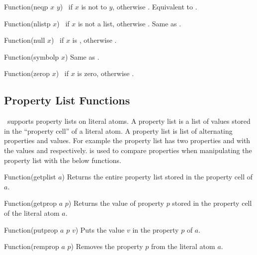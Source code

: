 \begin{defun}{Function}{(neqp $x$ $y$)}
  \T\ if $x$ is not  to $y$, otherwise \NIL. Equivalent to
  .
\end{defun}

\begin{defun}{Function}{(nlistp $x$)}
  \T\ if $x$ is not a list, otherwise \NIL. Same as .
\end{defun}

\begin{defun}{Function}{(null $x$)}
  \T\ if $x$ is \NIL, otherwise \NIL.
\end{defun}

\begin{defun}{Function}{(symbolp $x$)}
  Same as .
\end{defun}

\begin{defun}{Function}{(zerop $x$)}
  \T\ if $x$ is zero, otherwise \NIL.
\end{defun}

\subsection{Property List Functions}
\lips\ supports property lists on literal atoms. A property list is a
list of values stored in the ``property cell'' of a literal atom. A
property list is list of alternating properties and values. For
example the property list  has two properties 
and  with the values  and 
respectively.  is used to compare properties when
manipulating the property list with the below functions.

\begin{defun}{Function}{(getplist $a$)}
  Returns the entire property list stored in the property cell of $a$.
\end{defun}


\begin{defun}{Function}{(getprop $a$ $p$)}
  Returns the value of property $p$ stored in the property cell of the
  literal atom $a$.
\end{defun}

\begin{defun}{Function}{(putprop $a$ $p$ $v$)}
  Puts the value $v$ in the property $p$ of $a$.
\end{defun}

\begin{defun}{Function}{(remprop $a$ $p$)}
  Removes the property $p$ from the literal atom $a$.
\end{defun}

